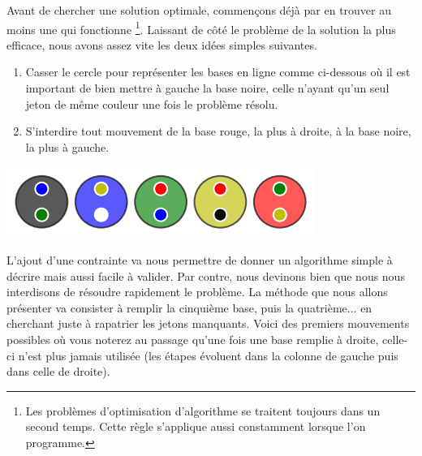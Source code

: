 Avant de chercher une solution optimale, commençons déjà par en trouver au moins une qui fonctionne
\footnote{
	Les problèmes d'optimisation d'algorithme se traitent toujours dans un second temps. Cette règle s'applique aussi constamment lorsque l'on programme.
}.
Laissant de côté le problème de la solution la plus efficace, nous avons assez vite les deux idées simples suivantes.

\begin{enumerate}
	\item Casser le cercle pour représenter les bases en ligne comme ci-dessous où il est important de bien mettre à gauche la base noire, celle n'ayant qu'un seul jeton de même couleur une fois le problème résolu.

	\item S'interdire tout mouvement de la base rouge, la plus à droite, à la base noire, la plus à gauche.
\end{enumerate}

\vspace{-0.4em}
\begin{center}   %
	\includegraphics[scale= 0.45]{content/algo_selection/example/000.png}
\end{center}
\vspace{-0.8em}


L'ajout d'une contrainte va nous permettre de donner un algorithme simple à décrire mais aussi facile à valider. Par contre, nous devinons bien que nous nous interdisons de résoudre rapidement le problème.
La méthode que nous allons présenter va consister à remplir la cinquième base, puis la quatrième... en cherchant juste à rapatrier les jetons manquants. Voici des premiers mouvements possibles où vous noterez au passage qu'une fois une base remplie à droite, celle-ci n'est plus jamais utilisée (les étapes évoluent dans la colonne de gauche puis dans celle de droite).


\medskip

